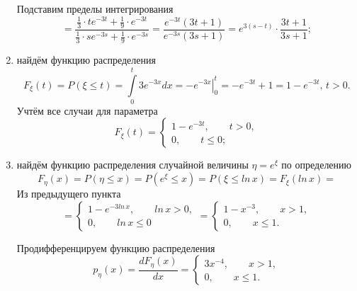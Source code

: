\begin{enumerate}[label=\alph*)]
\begin{equation*}
  \end{equation*}
  Подставим пределы интегрирования
  \begin{equation*}
    = \frac{ \frac{1}{3} \cdot te^{-3t} + \frac{1}{9} \cdot e^{-3t}}{ \frac{1}{3} \cdot se^{-3s} + \frac{1}{9} \cdot e^{-3s}} =
    \frac{e^{-3t} \left(3t + 1 \right) }{e^{-3s} \left( 3s + 1 \right) } =
    e^{3 \left( s - t \right) } \cdot \frac{3t + 1}{3s + 1};
  \end{equation*}
  \item найдём функцию распределения
  \begin{equation*}
    F_{ \xi } \left( t \right) =
    P \left( \xi \leq t \right) =
    \int \limits_0^t 3e^{-3x} dx =
    \left. -e^{-3x} \right|_0^t =
    -e^{-3t} + 1 =
    1 - e^{-3t}, \,
    t > 0.
  \end{equation*}
  Учтём все случаи для параметра
  \begin{equation*}
    F_{ \xi } \left( t \right) =
    \begin{cases}
      1 - e^{-3t}, \qquad t > 0, \\
      0, \qquad t \leq 0;
    \end{cases}
  \end{equation*}
  \item найдём функцию распределения случайной величины $ \eta = e^{ \xi }$
  по определению
  \begin{equation*}
    F_{ \eta } \left( x \right) =
    P \left( \eta \leq x \right) =
    P \left( e^{ \xi } \leq x \right) =
    P \left( \xi \leq ln \, x \right) =
    F_{ \xi } \left( ln \, x \right) =
  \end{equation*}
  Из предыдущего пункта
  \begin{equation*}
    = \begin{cases}
      1 - e^{-3 ln \, x}, \qquad ln \, x > 0, \\
      0, \qquad ln \, x \leq 0
    \end{cases} =
    \begin{cases}
      1 - x^{-3}, \qquad x > 1, \\
      0, \qquad x \leq 1.
    \end{cases}
  \end{equation*}

  Продифференцируем функцию распределения
  \begin{equation*}
    p_{ \eta } \left( x \right) =
    \frac{dF_{ \eta } \left( x \right) }{dx} =
    \begin{cases}
      3x^{-4}, \qquad x > 1, \\
      0, \qquad x \leq 1.
    \end{cases}
  \end{equation*}
\end{enumerate}

